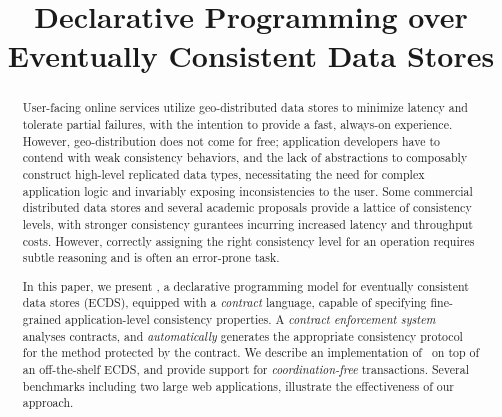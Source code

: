 \documentclass[pldi,nocopyrightspace]{sigplanconf}
\newcommand{\ecds}{ECDS}
\begin{document}
%
%

\title{Declarative Programming over Eventually Consistent Data Stores }

\maketitle
\begin{abstract}
User-facing online services utilize geo-distributed data stores to minimize
latency and tolerate partial failures, with the intention to provide a fast,
always-on experience. However, geo-distribution does not come for free;
application developers have to contend with weak consistency behaviors, and
the lack of abstractions to composably construct high-level replicated data
types, necessitating the need for complex application logic and invariably
exposing inconsistencies to the user. Some commercial distributed data
stores and several academic proposals provide a lattice of consistency
levels, with stronger consistency gurantees incurring increased latency and
throughput costs. However, correctly assigning the right consistency level
for an operation requires subtle reasoning and is often an error-prone task.

In this paper, we present \name, a declarative programming model for eventually
consistent data stores (\ecds), equipped with a \emph{contract} language,
capable of specifying fine-grained application-level consistency properties. A
\emph{contract enforcement system} analyses contracts, and \emph{automatically}
generates the appropriate consistency protocol for the method protected by the
contract. We describe an implementation of \name\ on top of an off-the-shelf
\ecds, and provide support for \emph{coordination-free} transactions. Several
benchmarks including two large web applications, illustrate the effectiveness
of our approach.
\end{abstract}




















\small

\end{document}
